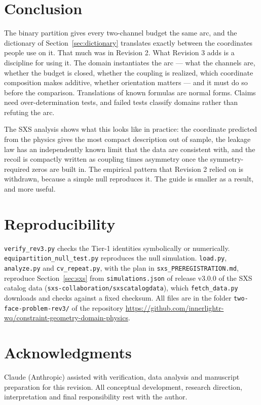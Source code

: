 \documentclass[11pt]{article}
\theoremstyle{definition}
\theoremstyle{remark}
\begin{document}
\section{Conclusion}\label{sec:conclusion}

The binary partition gives every two-channel budget the same arc, and the dictionary of
Section~\ref{sec:dictionary} translates exactly between the coordinates people use on it.
That much was in Revision 2. What Revision 3 adds is a discipline for using it. The domain
instantiates the arc --- what the channels are, whether the budget is closed, whether the
coupling is realized, which coordinate composition makes additive, whether orientation
matters --- and it must do so before the comparison. Translations of known formulas are
normal forms. Claims need over-determination tests, and failed tests classify domains rather
than refuting the arc.

The SXS analysis shows what this looks like in practice: the coordinate predicted from the
physics gives the most compact description out of sample, the leakage law has an
independently known limit that the data are consistent with, and the recoil is compactly
written as coupling times asymmetry once the symmetry-required zeros are built in. The
empirical pattern that Revision 2 relied on is withdrawn, because a simple null reproduces
it. The guide is smaller as a result, and more useful.

\section*{Reproducibility}
\sloppy
\texttt{verify\_rev3.py} checks the Tier-1 identities symbolically or numerically.
\texttt{equipartition\_null\_test.py} reproduces the null simulation. \texttt{load.py},
\texttt{analyze.py} and \texttt{cv\_repeat.py}, with the plan in \texttt{sxs\_PREREGISTRATION.md},
reproduce Section~\ref{sec:sxs} from \texttt{simulations.json} of release v3.0.0 of the SXS
catalog data (\texttt{sxs-collaboration/sxscatalogdata}), which \texttt{fetch\_data.py}
downloads and checks against a fixed checksum. All files are in the folder
\texttt{two-face-problem-rev3/} of the repository
\url{https://github.com/innerlightr-wq/constraint-geometry-domain-physics}.

\section*{Acknowledgments}
Claude (Anthropic) assisted with verification, data analysis and manuscript preparation for
this revision. All conceptual development, research direction, interpretation and final
responsibility rest with the author.
\end{document}
